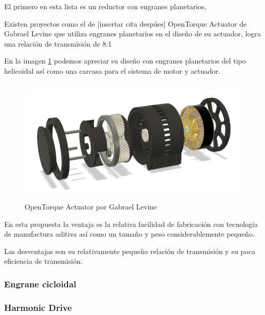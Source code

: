 El primero en esta lista es un reductor con engranes planetarios, 

Existen proyectos como el de [insertar cita despúes] OpenTorque Actuator de Gabrael Levine que utiliza engranes planetarios en el diseño de su actuador, logra una relación de transmisión de 8:1

En la imagen \ref{fig:opentorque} podemos apreciar su diseño con engranes planetarios del tipo  helicoidal así como una carcasa para el sistema de motor y actuador. 

\begin{figure}[h]
    \centering
    \includegraphics[width=15cm, height=6cm, keepaspectratio]{./img/chapter6/opentorque.png}
    \caption{OpenTorque Actuator por Gabrael Levine}
    \label{fig:opentorque}
\end{figure}

En esta propuesta la ventaja es la relativa facilidad de fabricación con tecnología de manufactura aditiva así como un tamaño y peso considerablemente pequeño.

Las desventajas son su relativamente pequeño relación de transmisión y su poca eficiencia de transmisión.

\subsubsection{Engrane cicloidal}
\subsubsection{Harmonic Drive}

  